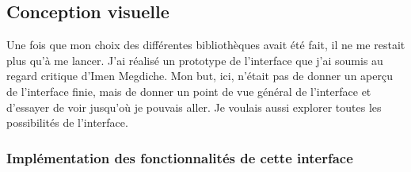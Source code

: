 \documentclass[french]{article}
\begin{document}
	\subsection{Conception visuelle}

    Une fois que mon choix des différentes bibliothèques avait été fait, il ne
    me restait plus qu'à me lancer. J'ai réalisé un prototype de l'interface
    que j'ai soumis au regard critique d'Imen Megdiche. Mon but, ici, n'était pas de
    donner un aperçu de l'interface finie, mais de donner un point de vue général
    de l'interface et d'essayer de voir jusqu'où je pouvais aller. Je voulais aussi
    explorer toutes les possibilités de l'interface.

\begin{figure}[h!]
     	\centering
     	\caption{}
    \end{figure}
    \clearpage
\pagebreak	

		\subsubsection{Implémentation des fonctionnalités de cette interface}
		
\end{document}

